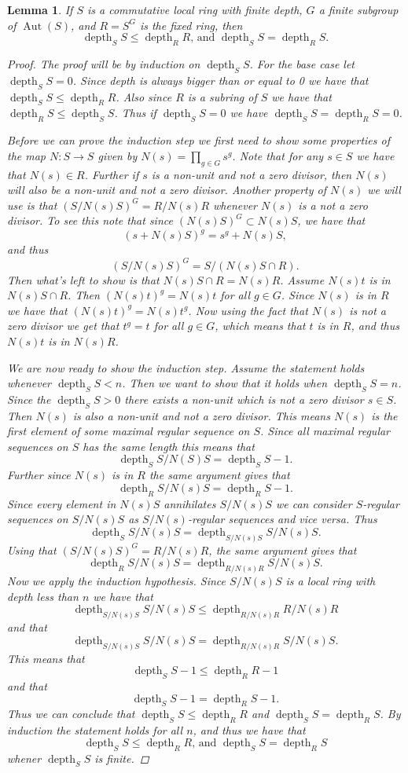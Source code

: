 \documentclass[11pt, a4paper, english]{article}
\newtheorem{lemma}[theorem]{Lemma}
\theoremstyle{definition}
\DeclareMathOperator{\Aut}{Aut}
\DeclareMathOperator{\depth}{depth}
\begin{document}
\begin{lemma}
\label{lem:depth_of_S_less_than_R}
If $S$ is a commutative local ring with finite depth, $G$ a finite subgroup of $\Aut(S)$, and $R=S^G$ is the fixed ring, then $$\depth_SS \leq \depth_RR\text{, and }\depth_SS = \depth_RS.$$
\begin{proof}
The proof will be by induction on $\depth_SS$. For the base case let $\depth_SS = 0$. Since depth is always bigger than or equal to 0 we have that $\depth_SS \leq \depth_RR$. Also since $R$ is a subring of $S$ we have that $\depth_RS \leq \depth_SS$. Thus if $\depth_SS = 0$ we have $\depth_SS = \depth_RS=0$.

Before we can prove the induction step we first need to show some properties of the map $N: S \to S$ given by $N(s) = \prod_{g\in G} s^g$. Note that for any $s \in S$ we have that $N(s) \in R$. Further if $s$ is a non-unit and not a zero divisor, then $N(s)$ will also be a non-unit and not a zero divisor. Another property of $N(s)$ we will use is that $\left(S/N(s)S\right)^G = R/N(s)R$ whenever $N(s)$ is a not a zero divisor. To see this note that since $(N(s)S)^G \subset N(s)S$, we have that $$(s + N(s)S)^g = s^g + N(s)S,$$ and thus $$\left(S/N(s)S\right)^G = S/\left(N(s)S \cap R \right).$$ Then what's left to show is that $N(s)S \cap R = N(s)R$. Assume $N(s)t$ is in $N(s)S\cap R$. Then $(N(s)t)^g = N(s)t$ for all $g \in G$. Since $N(s)$ is in $R$ we have that $(N(s)t)^g = N(s)t^g$. Now using the fact that $N(s)$ is not a zero divisor we get that $t^g = t$ for all $g \in G$, which means that $t$ is in $R$, and thus $N(s)t$ is in $N(s)R$.

We are now ready to show the induction step. Assume the statement holds whenever $\depth_SS < n$. Then we want to show that it holds when $\depth_SS = n$. Since the $\depth_SS > 0$ there exists a non-unit which is not a zero divisor $s \in S$. Then $N(s)$ is also a non-unit and not a zero divisor. This means $N(s)$ is the first element of some maximal regular sequence on $S$. Since all maximal regular sequences on $S$ has the same length this means that $$\depth_S S/N(S)S = \depth_SS -1.$$ Further since $N(s)$ is in $R$ the same argument gives that $$\depth_R S/N(s)S = \depth_RS -1.$$ Since every element in $N(s)S$ annihilates $S/N(s)S$ we can consider $S$-regular sequences on $S/N(s)S$ as $S/N(s)$-regular sequences and vice versa. Thus $$\depth_S S/N(s)S = \depth_{S/N(s)S} S/N(s)S.$$ Using that $\left( S/N(s)S \right)^G = R/N(s)R$, the same argument gives that $$\depth_R S/N(s)S = \depth_{R/N(s)R} S/N(s)S.$$ Now we apply the induction hypothesis. Since $S/N(s)S$ is a local ring with depth less than $n$ we have that $$\depth_{S/N(s)S} S/N(s)S \leq \depth_{R/N(s)R} R/N(s)R$$ and that $$\depth_{S/N(s)S} S/N(s)S = \depth_{R/N(s)R} S/N(s)S.$$ This means that $$\depth_S S -1 \leq \depth_RR -1$$ and that $$\depth_S S - 1 = \depth_R S -1.$$ Thus we can conclude that $\depth_SS \leq \depth_RR$ and $\depth_SS = \depth_RS$. By induction the statement holds for all $n$, and thus we have that $$\depth_SS \leq \depth_RR\text{, and }\depth_SS = \depth_RS$$ whener $\depth_SS$ is finite.
\end{proof}
\end{lemma}
\end{document}
